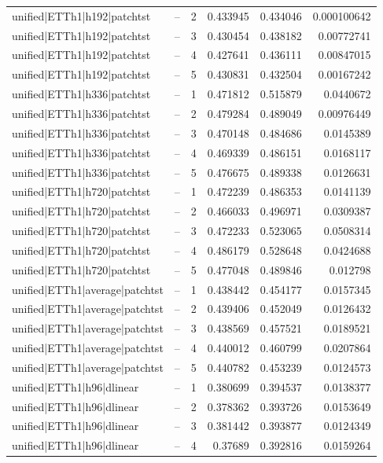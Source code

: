 \begin{longtable}{llrrrr}
unified|ETTh1|h192|patchtst & -- & 2 & 0.433945 & 0.434046 & 0.000100642 \\
unified|ETTh1|h192|patchtst & -- & 3 & 0.430454 & 0.438182 & 0.00772741 \\
unified|ETTh1|h192|patchtst & -- & 4 & 0.427641 & 0.436111 & 0.00847015 \\
unified|ETTh1|h192|patchtst & -- & 5 & 0.430831 & 0.432504 & 0.00167242 \\
unified|ETTh1|h336|patchtst & -- & 1 & 0.471812 & 0.515879 & 0.0440672 \\
unified|ETTh1|h336|patchtst & -- & 2 & 0.479284 & 0.489049 & 0.00976449 \\
unified|ETTh1|h336|patchtst & -- & 3 & 0.470148 & 0.484686 & 0.0145389 \\
unified|ETTh1|h336|patchtst & -- & 4 & 0.469339 & 0.486151 & 0.0168117 \\
unified|ETTh1|h336|patchtst & -- & 5 & 0.476675 & 0.489338 & 0.0126631 \\
unified|ETTh1|h720|patchtst & -- & 1 & 0.472239 & 0.486353 & 0.0141139 \\
unified|ETTh1|h720|patchtst & -- & 2 & 0.466033 & 0.496971 & 0.0309387 \\
unified|ETTh1|h720|patchtst & -- & 3 & 0.472233 & 0.523065 & 0.0508314 \\
unified|ETTh1|h720|patchtst & -- & 4 & 0.486179 & 0.528648 & 0.0424688 \\
unified|ETTh1|h720|patchtst & -- & 5 & 0.477048 & 0.489846 & 0.012798 \\
unified|ETTh1|average|patchtst & -- & 1 & 0.438442 & 0.454177 & 0.0157345 \\
unified|ETTh1|average|patchtst & -- & 2 & 0.439406 & 0.452049 & 0.0126432 \\
unified|ETTh1|average|patchtst & -- & 3 & 0.438569 & 0.457521 & 0.0189521 \\
unified|ETTh1|average|patchtst & -- & 4 & 0.440012 & 0.460799 & 0.0207864 \\
unified|ETTh1|average|patchtst & -- & 5 & 0.440782 & 0.453239 & 0.0124573 \\
unified|ETTh1|h96|dlinear & -- & 1 & 0.380699 & 0.394537 & 0.0138377 \\
unified|ETTh1|h96|dlinear & -- & 2 & 0.378362 & 0.393726 & 0.0153649 \\
unified|ETTh1|h96|dlinear & -- & 3 & 0.381442 & 0.393877 & 0.0124349 \\
unified|ETTh1|h96|dlinear & -- & 4 & 0.37689 & 0.392816 & 0.0159264 \\

\end{longtable}
